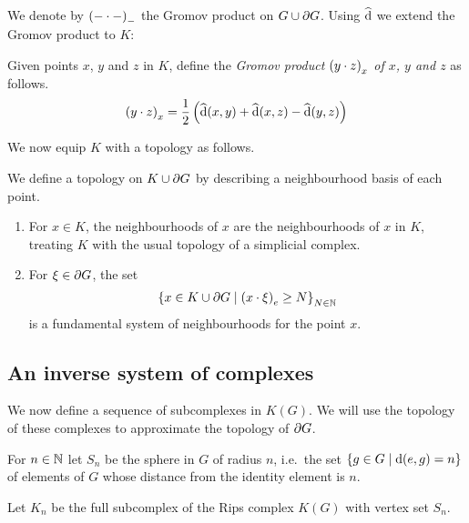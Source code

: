 \documentclass[a4paper]{article}
\begin{document}
We denote by $\gromov{{-}}{{-}}{{-}}$ the Gromov product on $G \union
\boundary G$. Using $\newdist$ we extend the Gromov product to $K$:

\begin{definition}
  Given points $x$, $y$ and $z$ in $K$, define the \emph{Gromov product
  $\gromov{x}{y}{z}$ of $x$, $y$ and $z$} as follows.
  \begin{equation*}
    \gromov{x}{y}{z} = \frac{1}{2}\left(\newdist(x,y) + \newdist(x,z) -
          \newdist(y,z)\right)
  \end{equation*}
\end{definition}

We now equip $K$ with a topology as follows.

\begin{definition}
  We define a topology on $K \union \boundary G$ by describing a neighbourhood
  basis of each point.
  \begin{enumerate}
    \item For $x \in K$, the neighbourhoods of $x$ are the neighbourhoods of
      $x$ in $K$, treating $K$ with the usual topology of a simplicial complex.
    \item For $\xi \in \boundary G$, the set
      \begin{equation*}
        \set{x \in K \union \boundary G \suchthat \gromov{e}{x}{\xi} \geq N}_{N\in\naturals}
      \end{equation*}
      is a fundamental system of neighbourhoods for the point $x$.
  \end{enumerate}
\end{definition}

\subsection{An inverse system of complexes}

We now define a sequence of subcomplexes in $K(G)$. We will use the topology of
these complexes to approximate the topology of $\boundary G$. 

\begin{definition}
  For $n \in \naturals$ let $S_n$ be the sphere in $G$ of radius $n$, i.e.\ the 
  set $\set{g \in G \suchthat \dist(e, g) = n}$ of elements of $G$ whose 
  distance from the identity element is $n$. 

  Let $K_n$ be the full subcomplex of the Rips complex $K(G)$ with vertex set
  $S_n$.
\end{definition}
\end{document}
